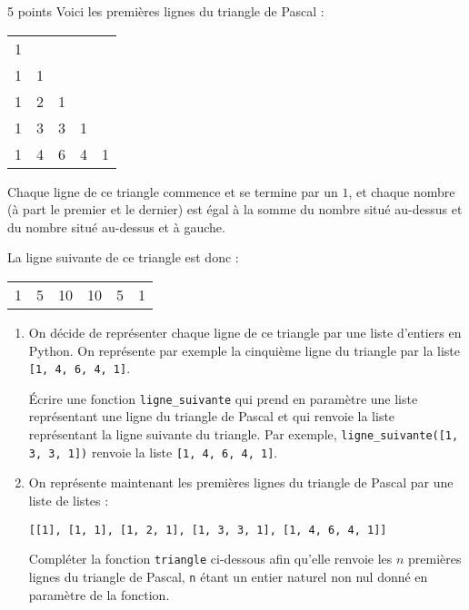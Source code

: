 \documentclass[a4paper,dvipsnames]{article}
\begin{document}
\begin{exercice}[breakable]{5 points}{}
  Voici les premières lignes du triangle de Pascal :
  \begin{center}
    \begin{tabular}{@{}ccccc@{}}
      1 & & & & \\
      1 & 1 & & &\\
      1 & 2 & 1 & &\\
      1 & 3 & 3 & 1 &\\
      1 & 4 & 6 & 4 & 1
    \end{tabular}
  \end{center}
  Chaque ligne de ce triangle commence et se termine par un $1$, et chaque nombre (à part le premier et le dernier) est égal à la somme du nombre situé au-dessus et du nombre situé \og{}au-dessus et à gauche\fg{}.

  La ligne suivante de ce triangle est donc :

  \begin{center}
    \begin{tabular}{@{}cccccc@{}}
      1 & 5 & 10 & 10 & 5 & 1\\
    \end{tabular}
  \end{center}

  \begin{enumerate}
    \item On décide de représenter chaque ligne de ce triangle par une liste d'entiers en Python. On représente par exemple la cinquième ligne du triangle par la liste \texttt{[1, 4, 6, 4, 1]}.

      Écrire une fonction \texttt{ligne_suivante} qui prend en paramètre une liste représentant une ligne du triangle de Pascal et qui renvoie la liste représentant la ligne suivante du triangle. Par exemple, \texttt{ligne_suivante([1, 3, 3, 1])} renvoie la liste \texttt{[1, 4, 6, 4, 1]}.

    \item On représente maintenant les premières lignes du triangle de Pascal par une liste de listes :

      \begin{center}
	\texttt{[[1], [1, 1], [1, 2, 1], [1, 3, 3, 1], [1, 4, 6, 4, 1]]} 
      \end{center}

      Compléter la fonction \texttt{triangle} ci-dessous afin qu'elle renvoie les $n$ premières lignes du triangle de Pascal, \texttt{n} étant un entier naturel non nul donné en paramètre de la fonction.


\end{enumerate}
\end{exercice}
\end{document}
